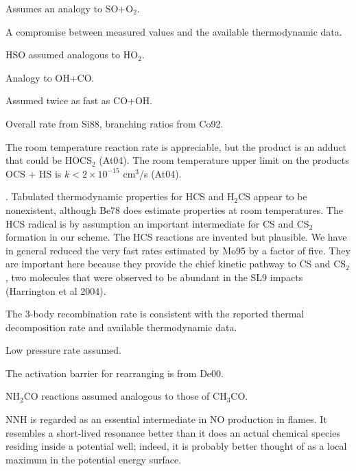 \documentclass[12pt,landscape]{article}
\newcounter{reaction}
\begin{document}
  Assumes an analogy to SO+O$_2$.
 
  A compromise between measured values and the available thermodynamic data.

 HSO assumed analogous to HO$_2$.  %

  Analogy to OH+CO.

  Assumed twice as fast as CO+OH.

  Overall rate from Si88, branching ratios from Co92.



 The room temperature reaction rate is appreciable, but the product is an adduct that could be HOCS$_2$ (At04). The room temperature upper limit on the products OCS + HS is $k<2\!\times\!10^{-15}$ cm$^3$/s (At04). 

. Tabulated thermodynamic properties for HCS and H$_2$CS appear to be nonexistent, although Be78 does estimate properties at room temperatures.
The HCS radical is by assumption an important intermediate for CS and CS$_2$ formation in our scheme.
The HCS reactions are invented but plausible. We have in general reduced the very fast rates estimated by Mo95 by a factor of five. They are important here because they provide the chief kinetic pathway to CS and CS$_2$, two molecules that were observed to be abundant in the SL9 impacts (Harrington et al 2004). 
 
  The 3-body recombination rate is consistent with the reported thermal decomposition rate and available thermodynamic data.

  Low pressure rate assumed.

  The activation barrier for rearranging is from De00.

  NH$_2$CO reactions assumed analogous to those of CH$_3$CO.

  NNH is regarded as an essential intermediate in NO production in flames.
It resembles a short-lived resonance better than it does an actual chemical species residing inside a potential well;
indeed, it is probably better thought of as a local maximum in the potential energy surface. 
\end{document}
